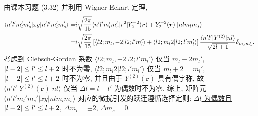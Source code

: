 \documentclass{assignment}
\begin{document}
\begin{sol}
\begin{itemize}
        由课本习题 (3.32) 并利用 Wigner-Eckart 定理,
        \begin{align}
            \notag\langle n'l'm_l'm_s'\rvert xy\lvert n'l'm_l'm_s'\rangle=&i\sqrt{\frac{2\pi}{15}}\langle n'l'm_l'm_s'\rvert r^2[Y_2^{-2}(\bm{r})+Y_2^{+2}(\bm{r})]\lvert nlm_lm_s\rangle\\
            =&i\sqrt{\frac{2\pi}{15}}\left[\langle l2;m_l,-2\vert l2;l'm_l'\rangle+\langle l2;m_l2\vert l2;l'm_l'\rangle\right]\frac{\langle n'l'\rvert Y^{(2)}\lvert nl\rangle}{\sqrt{2l+1}}\delta_{m_sm_s'}.
        \end{align}
        考虑到 Clebsch-Gordan 系数 $\langle l2;m_l,-2\vert l2;l'm_l'\rangle$ 仅当 $m_l-2m_l'$, $\left\lvert l-2\right\rvert\leq l'\leq l+2$ 时不为零, $\langle l2;m_l2\vert l2;l'm_l'\rangle$ 仅当 $m_l+2=m_l'$, $\left\lvert l-2\right\rvert\leq l'\leq l+2$ 时不为零, 并且由于 $Y^{(2)}(\bm{r})$ 具有偶宇称, 故 $\langle n'l'\rvert Y^{(2)}(\bm{r})\lvert nl\rangle$ 仅当 $\Delta l=l-l'$ 为偶数时不为零.
        综上, 矩阵元 $\langle n'l'm_l'm_s'\rvert xy\lvert nlm_lm_s\rangle$ 对应的微扰引发的跃迁遵循选择定则: \uline{$\Delta l$ 为偶数且 $\left\lvert l-2\right\rvert\leq l'\leq l+2$, $\Delta m_l=\pm 2$, $\Delta m_s=0$}.
    \end{itemize}
\end{sol}
\end{document}
